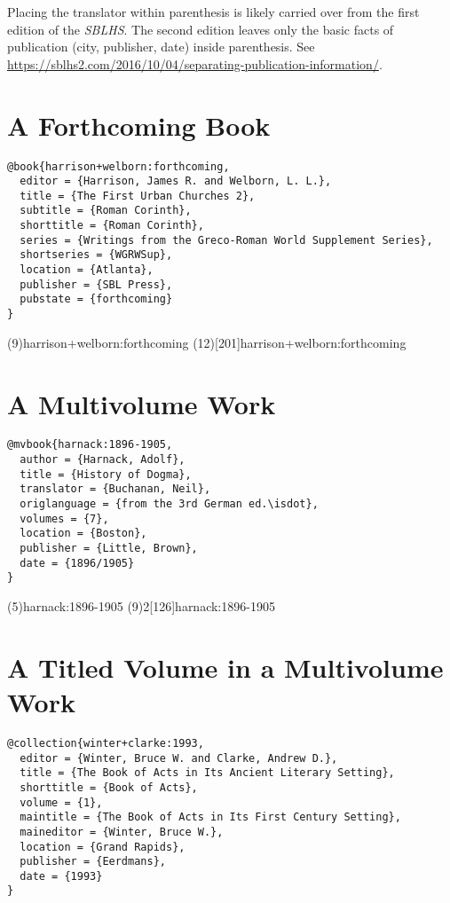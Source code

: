 \documentclass[a4paper]{article}
\begin{document}
Placing the translator within parenthesis is likely carried over from the
first edition of the \emph{SBLHS}. The second edition leaves only the basic
facts of publication (city, publisher, date) inside parenthesis. See
\url{https://sblhs2.com/2016/10/04/separating-publication-information/}.

\section{A Forthcoming Book}

\begin{verbatim}
@book{harrison+welborn:forthcoming,
  editor = {Harrison, James R. and Welborn, L. L.},
  title = {The First Urban Churches 2},
  subtitle = {Roman Corinth},
  shorttitle = {Roman Corinth},
  series = {Writings from the Greco-Roman World Supplement Series},
  shortseries = {WGRWSup},
  location = {Atlanta},
  publisher = {SBL Press},
  pubstate = {forthcoming}
}
\end{verbatim}

\examplecite(9){harrison+welborn:forthcoming}
\examplecite(12)[201]{harrison+welborn:forthcoming}
\exampleabbreviations
\examplebibliography

\section{A Multivolume Work}

\begin{verbatim}
@mvbook{harnack:1896-1905,
  author = {Harnack, Adolf},
  title = {History of Dogma},
  translator = {Buchanan, Neil},
  origlanguage = {from the 3rd German ed.\isdot},
  volumes = {7},
  location = {Boston},
  publisher = {Little, Brown},
  date = {1896/1905}
}
\end{verbatim}

\examplecite(5){harnack:1896-1905}
\examplevolcite(9){2}[126]{harnack:1896-1905}
\examplebibliography

\section{A Titled Volume in a Multivolume Work}

\begin{verbatim}
@collection{winter+clarke:1993,
  editor = {Winter, Bruce W. and Clarke, Andrew D.},
  title = {The Book of Acts in Its Ancient Literary Setting},
  shorttitle = {Book of Acts},
  volume = {1},
  maintitle = {The Book of Acts in Its First Century Setting},
  maineditor = {Winter, Bruce W.},
  location = {Grand Rapids},
  publisher = {Eerdmans},
  date = {1993}
}
\end{verbatim}
\end{document}
